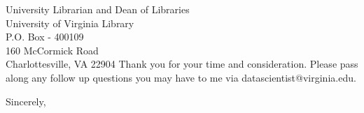 \documentclass{letter}
\begin{document}
\begin{letter}{University Librarian and Dean of Libraries \\ University of Virginia Library \\ P.O. Box - 400109 \\ 160 McCormick Road \\ Charlottesville, VA 22904}
Thank you for your time and consideration. Please pass along any follow up questions you may have to me via datascientist@virginia.edu.


\closing{Sincerely,}


\end{letter}
\end{document}
